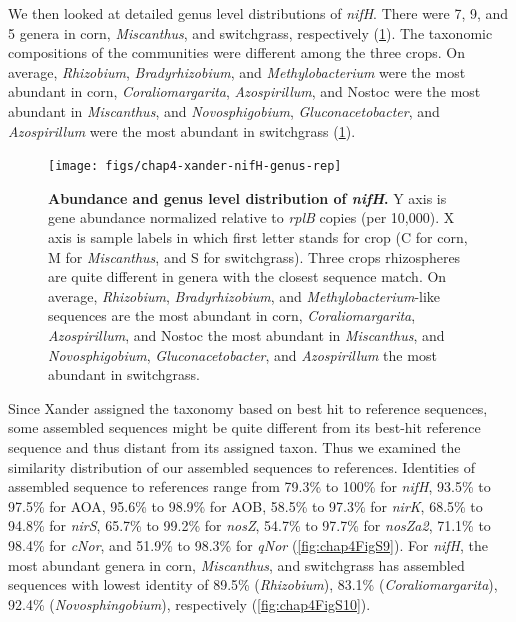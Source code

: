 \documentclass[]{msu-thesis}
\begin{document}
We then looked at detailed genus level distributions of \textit{nifH}.
There were 7, 9, and 5 genera in corn, \textit{Miscanthus}, and
switchgrass, respectively (\cref{fig:chap4Fig6}). The taxonomic
compositions of the communities were different among the three crops. On
average, \textit{Rhizobium}, \textit{Bradyrhizobium}, and
\textit{Methylobacterium} were the most abundant in corn,
\textit{Coraliomargarita}, \textit{Azospirillum}, and Nostoc were the
most abundant in \textit{Miscanthus}, and \textit{Novosphigobium},
\textit{Gluconacetobacter}, and \textit{Azospirillum} were the most
abundant in switchgrass (\cref{fig:chap4Fig6}).


\begin{figure}[tbph!]
  \centering
  \texttt{[image: figs/chap4-xander-nifH-genus-rep]}
  \caption[Abundance and genus level distribution of
  \textit{nifH}]{\textbf{Abundance and genus level distribution of
    \textit{nifH}.} Y axis is gene abundance normalized relative to
    \textit{rplB} copies (per 10,000). X axis is sample labels in which
    first letter stands for crop (C for corn, M for \textit{Miscanthus},
    and S for switchgrass). Three crops rhizospheres are quite different
    in genera with the closest sequence match. On average,
    \textit{Rhizobium}, \textit{Bradyrhizobium}, and
    \textit{Methylobacterium}-like sequences are the most abundant in
    corn, \textit{Coraliomargarita}, \textit{Azospirillum}, and Nostoc
    the most abundant in \textit{Miscanthus}, and
    \textit{Novosphigobium}, \textit{Gluconacetobacter}, and
    \textit{Azospirillum} the most abundant in switchgrass.}
  \label{fig:chap4Fig6}
\end{figure}


Since Xander assigned the taxonomy based on best hit to reference
sequences, some assembled sequences might be quite different from its
best-hit reference sequence and thus distant from its assigned taxon.
Thus we examined the similarity distribution of our assembled sequences
to references. Identities of assembled sequence to references range from
79.3\% to 100\% for \textit{nifH}, 93.5\% to 97.5\% for AOA, 95.6\% to
98.9\% for AOB, 58.5\% to 97.3\% for \textit{nirK}, 68.5\% to 94.8\% for
\textit{nirS}, 65.7\% to 99.2\% for \textit{nosZ}, 54.7\% to 97.7\% for
\textit{nosZa2}, 71.1\% to 98.4\% for \textit{cNor}, and 51.9\% to
98.3\% for \textit{qNor} (\cref{fig:chap4FigS9}). For \textit{nifH}, the
most abundant genera in corn, \textit{Miscanthus}, and switchgrass has
assembled sequences with lowest identity of 89.5\% (\textit{Rhizobium}),
83.1\% (\textit{Coraliomargarita}), 92.4\% (\textit{Novosphingobium}),
respectively (\cref{fig:chap4FigS10}).
\end{document}
